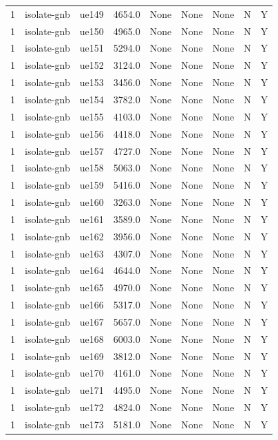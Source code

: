 \begin{table}[ht]
\begin{tabular}{|c|c|c|c|c|c|c|c|c|}
1 & isolate-gnb & ue149 & 4654.0 & None & None & None & N & Y \\
1 & isolate-gnb & ue150 & 4965.0 & None & None & None & N & Y \\
1 & isolate-gnb & ue151 & 5294.0 & None & None & None & N & Y \\
1 & isolate-gnb & ue152 & 3124.0 & None & None & None & N & Y \\
1 & isolate-gnb & ue153 & 3456.0 & None & None & None & N & Y \\
1 & isolate-gnb & ue154 & 3782.0 & None & None & None & N & Y \\
1 & isolate-gnb & ue155 & 4103.0 & None & None & None & N & Y \\
1 & isolate-gnb & ue156 & 4418.0 & None & None & None & N & Y \\
1 & isolate-gnb & ue157 & 4727.0 & None & None & None & N & Y \\
1 & isolate-gnb & ue158 & 5063.0 & None & None & None & N & Y \\
1 & isolate-gnb & ue159 & 5416.0 & None & None & None & N & Y \\
1 & isolate-gnb & ue160 & 3263.0 & None & None & None & N & Y \\
1 & isolate-gnb & ue161 & 3589.0 & None & None & None & N & Y \\
1 & isolate-gnb & ue162 & 3956.0 & None & None & None & N & Y \\
1 & isolate-gnb & ue163 & 4307.0 & None & None & None & N & Y \\
1 & isolate-gnb & ue164 & 4644.0 & None & None & None & N & Y \\
1 & isolate-gnb & ue165 & 4970.0 & None & None & None & N & Y \\
1 & isolate-gnb & ue166 & 5317.0 & None & None & None & N & Y \\
1 & isolate-gnb & ue167 & 5657.0 & None & None & None & N & Y \\
1 & isolate-gnb & ue168 & 6003.0 & None & None & None & N & Y \\
1 & isolate-gnb & ue169 & 3812.0 & None & None & None & N & Y \\
1 & isolate-gnb & ue170 & 4161.0 & None & None & None & N & Y \\
1 & isolate-gnb & ue171 & 4495.0 & None & None & None & N & Y \\
1 & isolate-gnb & ue172 & 4824.0 & None & None & None & N & Y \\
1 & isolate-gnb & ue173 & 5181.0 & None & None & None & N & Y \\

\end{tabular}
\end{table}
